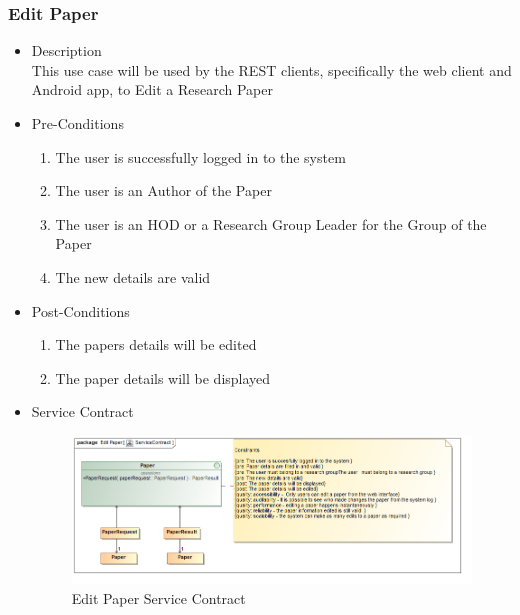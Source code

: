 \documentclass[a4paper,10pt]{article}
\begin{document}
\subsubsection{Edit Paper}
	\begin{itemize}
		\item Description\\
			This use case will be used by the REST clients, specifically the web client and Android app, to Edit a Research Paper
		\item Pre-Conditions
			\begin{enumerate}
				\item The user is successfully logged in to the system
				\item The user is an Author of the Paper
				\item The user is an HOD or a Research Group Leader for the Group of the Paper
				\item The new details are valid
			\end{enumerate}
		\item Post-Conditions
			\begin{enumerate}
				\item The papers details will be edited
				\item The paper details will be displayed
						
			\end{enumerate}
		\item Service Contract
			\begin{figure}[H]
				\includegraphics[scale=0.5]{EditPaperServiceContract}
				\caption{Edit Paper Service Contract}
			\end{figure}



	\end{itemize}
\end{document}
